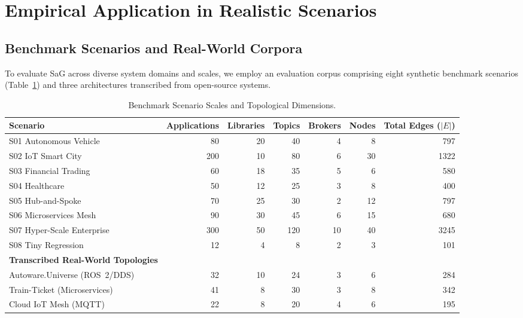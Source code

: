 \section{Empirical Application in Realistic Scenarios}
\label{sec:empirical_application}

\subsection{Benchmark Scenarios and Real-World Corpora}
\label{sec:exp:scenarios}

To evaluate SaG across diverse system domains and scales, we employ an evaluation corpus comprising eight synthetic benchmark scenarios (Table~\ref{tab:scenarios}) and three architectures transcribed from open-source systems.

\begin{table}[htbp]
\centering
\footnotesize
\setlength{\tabcolsep}{3.5pt}
\caption{Benchmark Scenario Scales and Topological Dimensions.}
\label{tab:scenarios}
\begin{tabular}{lrrrrrr}
\toprule
\textbf{Scenario} & \textbf{Applications} & \textbf{Libraries} & \textbf{Topics} & \textbf{Brokers} & \textbf{Nodes} & \textbf{Total Edges ($|E|$)} \\
\midrule
S01 Autonomous Vehicle & 80 & 20 & 40 & 4 & 8 & 797 \\
S02 IoT Smart City & 200 & 10 & 80 & 6 & 30 & 1322 \\
S03 Financial Trading & 60 & 18 & 35 & 5 & 6 & 580 \\
S04 Healthcare & 50 & 12 & 25 & 3 & 8 & 400 \\
S05 Hub-and-Spoke & 70 & 25 & 30 & 2 & 12 & 797 \\
S06 Microservices Mesh & 90 & 30 & 45 & 6 & 15 & 680 \\
S07 Hyper-Scale Enterprise & 300 & 50 & 120 & 10 & 40 & 3245 \\
S08 Tiny Regression & 12 & 4 & 8 & 2 & 3 & 101 \\
\midrule
\textbf{Transcribed Real-World Topologies} & & & & & & \\
Autoware.Universe (ROS~2/DDS) & 32 & 10 & 24 & 3 & 6 & 284 \\
Train-Ticket (Microservices) & 41 & 8 & 30 & 3 & 8 & 342 \\
Cloud IoT Mesh (MQTT) & 22 & 8 & 20 & 4 & 6 & 195 \\
\bottomrule
\end{tabular}
\end{table}

